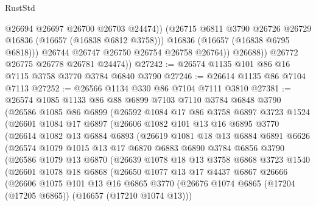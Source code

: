 \begin{lexlean}{RustStd}
\begin{coremodule}
                      @26694
                      @26697
                      @26700
                      @26703
                      @24474))
                  (@26715 @6811 @3790 @26726 @26729 @16836 (@16657 (@16838 @6812 @3758)))
                  @16836
                  (@16657 (@16838 @6795 @6818)))
                @26744
                @26747
                @26750
                @26754
                @26758
                @26764))
            @26688))
        @26772
        @26775
        @26778
        @26781
        @24474))
@27242 := @26574 @1135 @101 @86 @16 @7115 @3758 @3770 @3784 @6840 @3790
@27246 := @26614 @1135 @86 @7104 @7113
@27252 := @26566 @1134 @330 @86 @7104 @7111 @3810
@27381 := @26574
    @1085
    @1133
    @86
    @88
    @6899
    @7103
    @7110
    @3784
    @6848
    @3790
    (@26586
      @1085
      @86
      @6899
      (@26592
        @1084
        @17
        @86
        @3758
        @6897
        @3723
        @1524
        (@26601
          @1084
          @17
          @6897
          (@26606
            @1082
            @101
            @13
            @16
            @6895
            @3770
            (@26614
              @1082
              @13
              @6884
              @6893
              (@26619
                @1081
                @18
                @13
                @6884
                @6891
                @6626
                (@26574
                  @1079
                  @1015
                  @13
                  @17
                  @6870
                  @6883
                  @6890
                  @3784
                  @6856
                  @3790
                  (@26586
                    @1079
                    @13
                    @6870
                    (@26639
                      @1078
                      @18
                      @13
                      @3758
                      @6868
                      @3723
                      @1540
                      (@26601
                        @1078
                        @18
                        @6868
                        (@26650
                          @1077
                          @13
                          @17
                          @4437
                          @6867
                          @26666
                          (@26606
                            @1075
                            @101
                            @13
                            @16
                            @6865
                            @3770
                            (@26676 @1074 @6865 (@17204 (@17205 @6865)) (@16657 (@17210 @1074 @13)))

\end{coremodule}
\end{lexlean}
